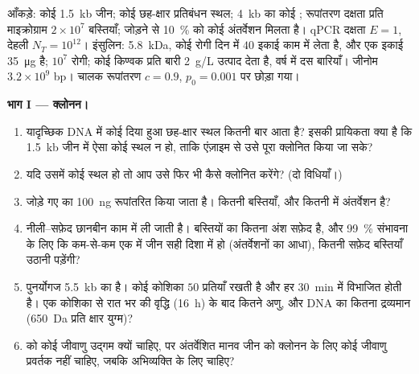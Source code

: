 \begin{problem}
\label{pb:b3:genetic-engineering:1}
आँकड़े: कोई \qty{1.5}{kb} जीन; कोई छह-क्षार प्रतिबंधन स्थल;
\qty{4}{kb} का कोई ; रूपांतरण दक्षता प्रति माइक्रोग्राम
 $2\times 10^{7}$ बस्तियाँ; जोड़ने से \qty{10}{\%} 
को कोई अंतर्वेशन मिलता है। qPCR दक्षता $E = 1$, देहली $N_{T} = 10^{12}$।
इंसुलिन: \qty{5.8}{kDa}, कोई रोगी दिन में $40$ इकाई काम में लेता है, और
एक इकाई \qty{35}{\micro g} है; $10^{7}$ रोगी; कोई किण्वक प्रति बारी
\qty{2}{g/L} उत्पाद देता है, वर्ष में दस बारियाँ। जीनोम $3.2\times
10^{9}$ bp। चालक रूपांतरण $c = 0.9$, $p_{0} = 0.001$ पर छोड़ा गया।

\medskip
\noindent\textbf{भाग I --- क्लोनन।}
\begin{enumerate}
  \item यादृच्छिक DNA में कोई दिया हुआ छह-क्षार स्थल कितनी बार आता है?
        इसकी प्रायिकता क्या है कि \qty{1.5}{kb} जीन में ऐसा कोई स्थल
        न हो, ताकि एंज़ाइम से उसे पूरा क्लोनित किया जा सके?
  \item यदि उसमें कोई स्थल हो तो आप उसे फिर भी कैसे क्लोनित करेंगे?
        (दो विधियाँ।)
  \item जोड़े गए  का \qty{100}{ng} रूपांतरित किया जाता है।
        कितनी बस्तियाँ, और कितनी में अंतर्वेशन है?
  \item नीली--सफ़ेद छानबीन काम में ली जाती है। बस्तियों का कितना अंश
        सफ़ेद है, और \qty{99}{\%} संभावना के लिए कि कम-से-कम एक में
        जीन सही दिशा में हो (अंतर्वेशनों का आधा), कितनी सफ़ेद बस्तियाँ
        उठानी पड़ेंगी?
  \item पुनर्योगज  \qty{5.5}{kb} का है। कोई कोशिका $50$
        प्रतियाँ रखती है और हर \qty{30}{min} में विभाजित होती है। एक
        कोशिका से रात भर की वृद्धि (\qty{16}{h}) के बाद कितने
         अणु, और  DNA का कितना द्रव्यमान
        (\qty{650}{Da} प्रति क्षार युग्म)?
  \item {} को कोई जीवाणु उद्गम क्यों चाहिए, पर अंतर्वेशित मानव
        जीन को क्लोनन के लिए कोई जीवाणु प्रवर्तक नहीं चाहिए, जबकि
        अभिव्यक्ति के लिए चाहिए?
\end{enumerate}


\end{problem}
